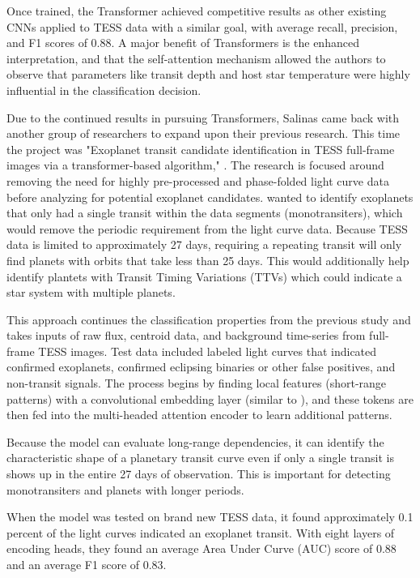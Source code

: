 \documentclass[letterpaper]{article} %
\begin{document}
Once trained, the Transformer achieved competitive results as other existing CNNs applied to TESS data with a similar goal, with average recall, precision, and F1 scores of 0.88. A major benefit of Transformers is the enhanced interpretation, and that the self-attention mechanism allowed the authors to observe that parameters like transit depth and host star temperature were highly influential in the classification decision.

Due to the continued results in pursuing Transformers, Salinas came back with another group of researchers to expand upon their previous research. This time the project was "Exoplanet transit candidate identification in TESS full-frame images via a transformer-based algorithm," \cite{salinas2025tessfullframe}. The research is focused around removing the need for highly pre-processed and phase-folded light curve data before analyzing for potential exoplanet candidates. \citeauthor{salinas2025tessfullframe} wanted to identify exoplanets that only had a single transit within the data segments (monotransiters), which would remove the periodic requirement from the light curve data. Because TESS data is limited to approximately 27 days, requiring a repeating transit will only find planets with orbits that take less than 25 days. This would additionally help identify plantets with Transit Timing Variations (TTVs) which could indicate a star system with multiple planets.

This approach continues the classification properties from the previous study \cite{salinas2023distinguishingtransitfalsepositives} and takes inputs of raw flux, centroid data, and background time-series from full-frame TESS images. Test data included labeled light curves that indicated confirmed exoplanets, confirmed eclipsing binaries or other false positives, and non-transit signals. The process begins by finding local features (short-range patterns) with a convolutional embedding layer (similar to \cite{salinas2023distinguishingtransitfalsepositives}), and these tokens are then fed into the multi-headed attention encoder to learn additional patterns.

Because the model can evaluate long-range dependencies, it can identify the characteristic shape of a planetary transit curve even if only a single transit is shows up in the entire 27 days of observation. This is important for detecting monotransiters and planets with longer periods.

When the model was tested on brand new TESS data, it found approximately 0.1 percent of the light curves indicated an exoplanet transit. With eight layers of encoding heads, they found an average Area Under Curve (AUC) score of 0.88 and an average F1 score of 0.83.
\end{document}
